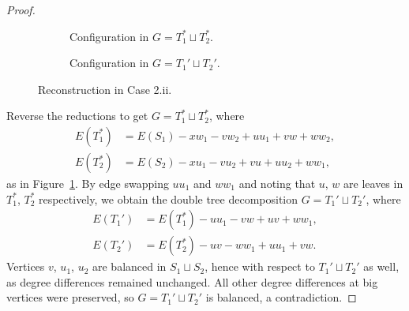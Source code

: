 \documentclass[11pt, reqno, a4paper]{article}
\theoremstyle{definition}
\numberwithin{equation}{section}
\begin{document}
\begin{proof}
\begin{figure}[ht]
\begin{subfigure}{0.4\textwidth}
	\caption{Configuration in $G= T_1^{\ast}\sqcup T_2^{\ast}$.}
	\label{fig:critrec2iib}
	\end{subfigure}
	\begin{subfigure}{0.4\textwidth}
    \centering
	\caption{Configuration in $G= T_1'\sqcup T_2'$.}
	\end{subfigure}
	\caption{Reconstruction in Case 2.ii.}
\end{figure}

Reverse the reductions to get $G= T_1^{\ast} \sqcup T_2^{\ast}$, where 
\begin{align*}
E(T_1^{\ast}) &= E(S_1) - xw_1 - vw_2 + uu_1 + vw +ww_2,\\
E(T_2^{\ast}) &= E(S_2) -xu_1 -vu_2+ vu + uu_2 + ww_1,
\end{align*}
as in Figure~\ref{fig:critrec2iib}.
By edge swapping $uu_1$ and $ww_1$ and noting that $u$, $w$ are leaves in $T_1^{\ast}$, $T_2^{\ast}$ respectively, we obtain the double tree decomposition $G= T_1'\sqcup T_2'$, where
\begin{align*}
E(T_1') &= E(T_1^{\ast}) - uu_1 - vw + uv + ww_1,\\
E(T_2') &= E(T_2^{\ast}) - uv - ww_1 + uu_1 + vw.
\end{align*}
Vertices $v$, $u_1$, $u_2$ are balanced in $S_1\sqcup S_2$, hence with respect to $T_1'\sqcup T_2'$ as well, as degree differences remained unchanged.
All other degree differences at big vertices were preserved, so $G=T_1'\sqcup T_2'$ is balanced, a contradiction.


\end{proof}
\end{document}
